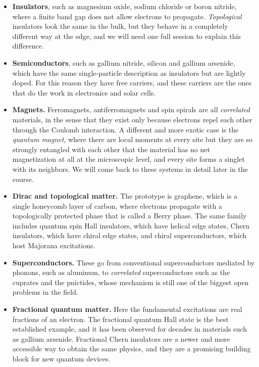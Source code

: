 \begin{itemize}
\item \textbf{Insulators}, such as magnesium oxide, sodium chloride or boron
  nitride, where a finite band gap does not allow electrons to propagate. \emph{Topological}
  insulators look the same in the bulk, but they behave in a completely different way at the edge,
  and we will need one full session to explain this difference.
\item \textbf{Semiconductors}, such as gallium nitride, silicon and gallium arsenide, which have the
  same single-particle description as insulators but are lightly doped. For this reason they have
  free carriers, and these carriers are the ones that do the work in electronics and solar cells.
\item \textbf{Magnets.} Ferromagnets, antiferromagnets and spin spirals are all \emph{correlated}
  materials, in the sense that they exist only because electrons repel each other through the
  Coulomb interaction. A different and more exotic case is the \emph{quantum magnet}, where there
  are local moments at every site but they are so strongly entangled with each other that the
  material has no net magnetization at all at the microscopic level, and every site forms a singlet
  with its neighbors. We will come back to these systems in detail later in the course.
\item \textbf{Dirac and topological matter.} The prototype is graphene, which is a single honeycomb
  layer of carbon, where electrons propagate with a topologically protected phase that is called a
  Berry phase. The same family includes quantum spin Hall insulators, which have helical edge
  states, Chern insulators, which have chiral edge states, and chiral superconductors, which host
  Majorana excitations.
\item \textbf{Superconductors.} These go from conventional superconductors mediated by phonons,
  such as aluminum, to \emph{correlated} superconductors such as the cuprates and the pnictides,
  whose mechanism is still one of the biggest open problems in the field.
\item \textbf{Fractional quantum matter.} Here the fundamental excitations are real fractions of an
  electron. The fractional quantum Hall state is the best established example, and it has been
  observed for decades in materials such as gallium arsenide. Fractional Chern insulators are a
  newer and more accessible way to obtain the same physics, and they are a promising building block
  for new quantum devices.
\end{itemize}

